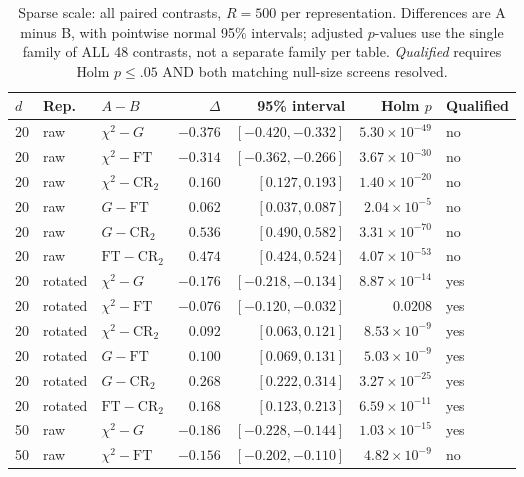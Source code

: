 \begin{table}[t]
\caption{Sparse scale: all paired contrasts, $R=500$ per representation. Differences are A minus B, with pointwise normal 95\% intervals; adjusted $p$-values use the single family of ALL 48 contrasts, not a separate family per table. \emph{Qualified} requires Holm $p\le .05$ AND both matching null-size screens resolved.}
\label{tab:matched-f-contrasts-sparse-scale}
\centering\small
\setlength{\tabcolsep}{8pt}\renewcommand{\arraystretch}{1.2}
\begin{tabular}{lllrrrl}
\toprule
$d$ & Rep. & $A-B$ & $\Delta$ & 95\% interval & Holm $p$ & Qualified \\
\midrule
20 & raw & $\chi^2-G$ & $-0.376$ & $[-0.420, -0.332]$ & $5.30\!\times\!10^{-49}$ & no \\
20 & raw & $\chi^2-\mathrm{FT}$ & $-0.314$ & $[-0.362, -0.266]$ & $3.67\!\times\!10^{-30}$ & no \\
20 & raw & $\chi^2-\mathrm{CR}_2$ & $0.160$ & $[0.127, 0.193]$ & $1.40\!\times\!10^{-20}$ & no \\
20 & raw & $G-\mathrm{FT}$ & $0.062$ & $[0.037, 0.087]$ & $2.04\!\times\!10^{-5}$ & no \\
20 & raw & $G-\mathrm{CR}_2$ & $0.536$ & $[0.490, 0.582]$ & $3.31\!\times\!10^{-70}$ & no \\
20 & raw & $\mathrm{FT}-\mathrm{CR}_2$ & $0.474$ & $[0.424, 0.524]$ & $4.07\!\times\!10^{-53}$ & no \\
20 & rotated & $\chi^2-G$ & $-0.176$ & $[-0.218, -0.134]$ & $8.87\!\times\!10^{-14}$ & yes \\
20 & rotated & $\chi^2-\mathrm{FT}$ & $-0.076$ & $[-0.120, -0.032]$ & $0.0208$ & yes \\
20 & rotated & $\chi^2-\mathrm{CR}_2$ & $0.092$ & $[0.063, 0.121]$ & $8.53\!\times\!10^{-9}$ & yes \\
20 & rotated & $G-\mathrm{FT}$ & $0.100$ & $[0.069, 0.131]$ & $5.03\!\times\!10^{-9}$ & yes \\
20 & rotated & $G-\mathrm{CR}_2$ & $0.268$ & $[0.222, 0.314]$ & $3.27\!\times\!10^{-25}$ & yes \\
20 & rotated & $\mathrm{FT}-\mathrm{CR}_2$ & $0.168$ & $[0.123, 0.213]$ & $6.59\!\times\!10^{-11}$ & yes \\
50 & raw & $\chi^2-G$ & $-0.186$ & $[-0.228, -0.144]$ & $1.03\!\times\!10^{-15}$ & yes \\
50 & raw & $\chi^2-\mathrm{FT}$ & $-0.156$ & $[-0.202, -0.110]$ & $4.82\!\times\!10^{-9}$ & no \\

\end{tabular}
\end{table}
